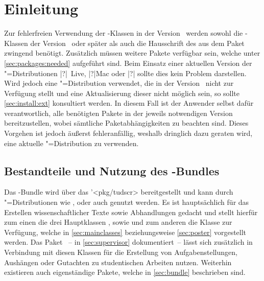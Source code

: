 \chapter{Einleitung}
%
Zur fehlerfreien Verwendung der \TUDScript-Klassen in der Version~\vTUDScript{} 
werden sowohl die \KOMAScript-Klassen der Version~\vKOMAScript{} oder später 
als auch die Hausschrift des \CDs \OpenSans aus dem Paket  
zwingend benötigt. Zusätzlich müssen weitere Pakete verfügbar sein, welche 
unter \autoref{sec:packages:needed} aufgeführt sind. Beim Einsatz einer 
aktuellen Version der "=Distributionen 
\Distribution|?|{~Live}, \Distribution|?|{Mac} oder 
\Distribution|?|{} sollte dies kein Problem darstellen. Wird 
jedoch eine "=Distribution verwendet, die \TUDScript in der 
Version~\vTUDScript{} nicht zur Verfügung stellt und eine Aktualisierung dieser 
nicht möglich sein, so sollte \autoref{sec:install:ext} konsultiert werden. In 
diesem Fall ist der Anwender selbst dafür verantwortlich, alle benötigten 
Pakete in der jeweils notwendigen Version bereitzustellen, wobei sämtliche 
Paketabhängigkeiten zu beachten sind. Dieses Vorgehen ist jedoch äußerst 
fehleranfällig, weshalb dringlich dazu geraten wird, eine aktuelle 
"=Distribution zu verwenden.



\section{Bestandteile und Nutzung des \TUDScript-Bundles}
%
%
Das \TUDScript-Bundle wird über das \CTAN'<pkg/tudscr> bereitgestellt und kann 
durch "=Distributionen wie , 
 oder auch  
genutzt werden. Es ist hauptsächlich für das Erstellen wissenschaftlicher 
Texte sowie Abhandlungen gedacht und stellt hierfür zum einen die drei 
Hauptklassen ,  sowie  
und zum anderen die Klasse  zur Verfügung, welche in 
\autoref{sec:mainclasses} beziehungsweise \autoref{sec:poster} vorgestellt 
werden. Das Paket ~-- in \autoref{sec:supervisor} 
dokumentiert~-- lässt sich zusätzlich in Verbindung mit diesen Klassen für die 
Erstellung von Aufgabenstellungen, Aushängen oder Gutachten zu studentischen 
Arbeiten nutzen. Weiterhin existieren auch eigenständige Pakete, welche in 
\autoref{sec:bundle} beschrieben sind. 

